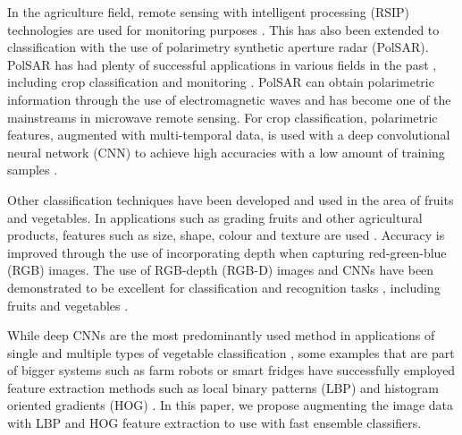 In the agriculture field, remote sensing with intelligent processing (RSIP) technologies are used for monitoring purposes \cite{b2_1}. This has also been extended to classification with the use of polarimetry synthetic aperture radar (PolSAR). PolSAR has had plenty of successful applications in various fields in the past \cite{b2_2,b2_3,b2_4}, including crop classification and monitoring \cite{b2_5,b2_6}. PolSAR can obtain polarimetric information through the use of electromagnetic waves and has become one of the mainstreams in microwave remote sensing. For crop classification, polarimetric features, augmented with multi-temporal data, is used with a deep convolutional neural network (CNN) to achieve high accuracies with a low amount of training samples \cite{b2_7}.

Other classification techniques have been developed and used in the area of fruits and vegetables. In applications such as grading fruits and other agricultural products, features such as size, shape, colour and texture are used \cite{b2_8,b2_9,b2_10}. Accuracy is improved through the use of incorporating depth when capturing red-green-blue (RGB) images. The use of RGB-depth (RGB-D) images and CNNs have been demonstrated to be excellent for classification and recognition tasks \cite{b2_11,b2_12}, including fruits and vegetables \cite{b2_13}.

While deep CNNs are the most predominantly used method in applications of single and multiple types of vegetable classification \cite{b2_14,b2_15,b2_16}, some examples that are part of bigger systems such as farm robots \cite{b2_17} or smart fridges \cite{b2_18} have successfully employed feature extraction methods such as local binary patterns (LBP) and histogram oriented gradients (HOG) \cite{b2_19,b2_20}. In this paper, we propose augmenting the image data with LBP and HOG feature extraction to use with fast ensemble classifiers.